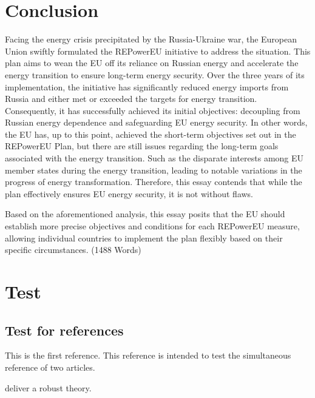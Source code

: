 \documentclass[12pt,a4paper]{article}
\begin{document}
\section{Conclusion}
Facing the energy crisis precipitated by the Russia-Ukraine war, the European Union swiftly formulated the REPowerEU initiative to address the situation. This plan aims to wean the EU off its reliance 
on Russian energy and accelerate the energy transition to ensure long-term energy security. Over the three years of its implementation, the initiative has significantly reduced energy imports from 
Russia and either met or exceeded the targets for energy transition. Consequently, it has successfully achieved its initial objectives: decoupling from Russian energy dependence and safeguarding EU 
energy security. In other words, the EU has, up to this point, achieved the short-term objectives set out in the REPowerEU Plan, but there are still issues regarding the long-term goals associated 
with the energy transition. Such as the disparate interests among EU member states during the energy transition, leading to notable variations in the progress of energy transformation. Therefore, 
this essay contends that while the plan effectively ensures EU energy security, it is not without flaws.

Based on the aforementioned analysis, this essay posits that the EU should establish more precise objectives and conditions for each REPowerEU measure, allowing individual countries to implement the 
plan flexibly based on their specific circumstances. (1488 Words)

\section{Test}


\subsection{Test for references}
This is the first reference\parencite{andrikogiannopoulou_reassessing_2019}. This reference is intended to test the simultaneous reference of two articles\parencite{barras_false_nodate,lee_boosting_2024}.

\textcite{wang_robust_2024} deliver a robust theory.
\end{document}
